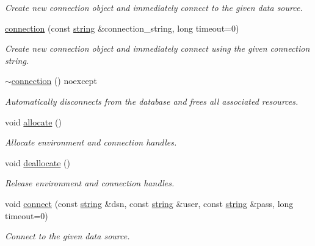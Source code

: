 \begin{DoxyCompactItemize}
\begin{DoxyCompactList}\small\item\em Create new connection object and immediately connect to the given data source. \end{DoxyCompactList}\item 
\mbox{\hyperlink{classnanodbc_1_1connection_ac1680824319607b0681ad6a8cca0660b}{connection}} (const \mbox{\hyperlink{namespacenanodbc_abfc0ece56278e590911ec8352774c212}{string}} \&connection\+\_\+string, long timeout=0)
\begin{DoxyCompactList}\small\item\em Create new connection object and immediately connect using the given connection string. \end{DoxyCompactList}\item 
\mbox{\hyperlink{classnanodbc_1_1connection_a115b960ed491c9db46430ff90f58606d}{$\sim$connection}} () noexcept
\begin{DoxyCompactList}\small\item\em Automatically disconnects from the database and frees all associated resources. \end{DoxyCompactList}\item 
void \mbox{\hyperlink{classnanodbc_1_1connection_abbb4205d3062eb487b71aeaa59d7d398}{allocate}} ()
\begin{DoxyCompactList}\small\item\em Allocate environment and connection handles. \end{DoxyCompactList}\item 
void \mbox{\hyperlink{classnanodbc_1_1connection_a625a5575d144f49f75b0e637bf297fad}{deallocate}} ()
\begin{DoxyCompactList}\small\item\em Release environment and connection handles. \end{DoxyCompactList}\item 
void \mbox{\hyperlink{classnanodbc_1_1connection_a480deb30989b18cad0394980fb181da7}{connect}} (const \mbox{\hyperlink{namespacenanodbc_abfc0ece56278e590911ec8352774c212}{string}} \&dsn, const \mbox{\hyperlink{namespacenanodbc_abfc0ece56278e590911ec8352774c212}{string}} \&user, const \mbox{\hyperlink{namespacenanodbc_abfc0ece56278e590911ec8352774c212}{string}} \&pass, long timeout=0)
\begin{DoxyCompactList}\small\item\em Connect to the given data source. \end{DoxyCompactList}\item 

\end{DoxyCompactItemize}
